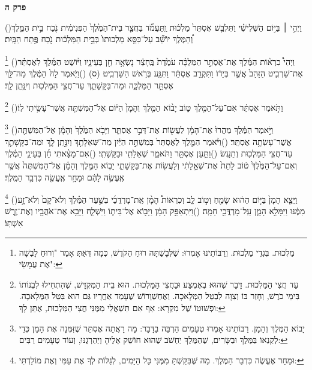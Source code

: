 \documentclass[12pt, openany]{book}
\newcommand{\sethebfont}{
\fontsize{10.5pt}{13.1pt} \selectfont
}
\newcommand{\twocol}[1]{
	{\sethebfont \begin{multicols}{2}
			#1
	\end{multicols}}	
}
\newcommand{\chapname}{}
\newcommand{\newchap}[1]{
	\addcontentsline{toc}{chapter}{#1}
	\renewcommand{\chapname}{#1}
		\begin{center}
			\textbf{%
\fontsize{16pt}{16pt}\selectfont
				#1}
		\end{center}
}
\newcommand{\footnotecomment}[1]{
	\renewcommand\thefootnote{}
	\footnote{#1}}
\newcommand{\commenta}[1]{\footnotecomment{#1}\hspace{0em}}
\newcommand{\vsnum}[1]{(\hebrewnumeral{#1})\space}
\begin{document}
\newchap{פרק ה}
\twocol{\vsnum{1}וַיְהִ֣י ׀ בַּיּ֣וֹם הַשְּׁלִישִׁ֗י וַתִּלְבַּ֤שׁ אֶסְתֵּר֙ מַלְכ֔וּת וַֽתַּעֲמֹ֞ד בַּחֲצַ֤ר בֵּית־הַמֶּ֙לֶךְ֙ הַפְּנִימִ֔ית נֹ֖כַח בֵּ֣ית הַמֶּ֑לֶךְ וְ֠הַמֶּלֶךְ יוֹשֵׁ֞ב עַל־כִּסֵּ֤א מַלְכוּתוֹ֙ בְּבֵ֣ית הַמַּלְכ֔וּת נֹ֖כַח פֶּ֥תַח הַבָּֽיִת׃%
\commenta{מַלְכוּת. בִּגְדֵי מַלְכוּת. וְרַבּוֹתֵינוּ אָמְרוּ: שֶׁלְּבָשַׁתָּה רוּחַ הַקֹּדֶשׁ, כְּמָה דְּאַתְּ אָמַר "וְרוּחַ לָבְשָׁה אֶת עֲמָשַׂי": }%
\vsnum{2}וַיְהִי֩ כִרְא֨וֹת הַמֶּ֜לֶךְ אֶת־אֶסְתֵּ֣ר הַמַּלְכָּ֗ה עֹמֶ֙דֶת֙ בֶּֽחָצֵ֔ר נָשְׂאָ֥ה חֵ֖ן בְּעֵינָ֑יו וַיּ֨וֹשֶׁט הַמֶּ֜לֶךְ לְאֶסְתֵּ֗ר אֶת־שַׁרְבִ֤יט הַזָּהָב֙ אֲשֶׁ֣ר בְּיָד֔וֹ וַתִּקְרַ֣ב אֶסְתֵּ֔ר וַתִּגַּ֖ע בְּרֹ֥אשׁ הַשַּׁרְבִֽיט׃ (ס)
\vsnum{3}וַיֹּ֤אמֶר לָהּ֙ הַמֶּ֔לֶךְ מַה־לָּ֖ךְ אֶסְתֵּ֣ר הַמַּלְכָּ֑ה וּמַה־בַּקָּשָׁתֵ֛ךְ עַד־חֲצִ֥י הַמַּלְכ֖וּת וְיִנָּ֥תֵֽן לָֽךְ׃%
\commenta{עַד חֲצִי הַמַּלְכוּת. דָּבָר שֶׁהוּא בְאֶמְצַע וּבַחֲצִי הַמַּלְכוּת. הוּא בֵית הַמִּקְדָּשׁ, שֶׁהִתְחִילוּ לִבְנוֹתוֹ בִּימֵי כֹרֶשׁ, וְחָזַר בּוֹ וְצִוָּה לְבַטֵּל הַמְּלָאכָה. וַאֲחַשְׁוֵרוֹשׁ שֶׁעָמַד אַחֲרָיו גַּם הוּא בִּטֵּל הַמְּלָאכָה. וּפְשׁוּטוֹ שֶׁל מִקְרָא: אַף אִם תִּשְׁאֲלִי מִמֶּנִּי חֲצִי הַמַּלְכוּת, אֶתֵּן לָךְ: }%
\vsnum{4}וַתֹּ֣אמֶר אֶסְתֵּ֔ר אִם־עַל־הַמֶּ֖לֶךְ ט֑וֹב יָב֨וֹא הַמֶּ֤לֶךְ וְהָמָן֙ הַיּ֔וֹם אֶל־הַמִּשְׁתֶּ֖ה אֲשֶׁר־עָשִׂ֥יתִי לֽוֹ׃%
\commenta{יָבוֹא הַמֶּלֶךְ וְהָמָן. רַבּוֹתֵינוּ אָמְרוּ טְעָמִים הַרְבֵּה בַדָּבָר: מָה רָאֲתָה אֶסְתֵּר שֶׁזִּמְּנָה אֶת הָמָן כְּדֵי לְקַנְאוֹ בַּמֶּלֶךְ וּבַשָּׂרִים, שֶׁהַמֶּלֶךְ יַחְשֹׁב שֶׁהוּא חוֹשֵׁק אֵלֶיהָ וְיַהַרְגֶנּוּ, וְעוֹד טְעָמִים רַבִּים: }%
\vsnum{5}וַיֹּ֣אמֶר הַמֶּ֔לֶךְ מַהֲרוּ֙ אֶת־הָמָ֔ן לַעֲשׂ֖וֹת אֶת־דְּבַ֣ר אֶסְתֵּ֑ר וַיָּבֹ֤א הַמֶּ֙לֶךְ֙ וְהָמָ֔ן אֶל־הַמִּשְׁתֶּ֖ה אֲשֶׁר־עָשְׂתָ֥ה אֶסְתֵּֽר׃
\vsnum{6}וַיֹּ֨אמֶר הַמֶּ֤לֶךְ לְאֶסְתֵּר֙ בְּמִשְׁתֵּ֣ה הַיַּ֔יִן מַה־שְּׁאֵלָתֵ֖ךְ וְיִנָּ֣תֵֽן לָ֑ךְ וּמַה־בַּקָּשָׁתֵ֛ךְ עַד־חֲצִ֥י הַמַּלְכ֖וּת וְתֵעָֽשׂ׃
\vsnum{7}וַתַּ֥עַן אֶסְתֵּ֖ר וַתֹּאמַ֑ר שְׁאֵלָתִ֖י וּבַקָּשָׁתִֽי׃
\vsnum{8}אִם־מָצָ֨אתִי חֵ֜ן בְּעֵינֵ֣י הַמֶּ֗לֶךְ וְאִם־עַל־הַמֶּ֙לֶךְ֙ ט֔וֹב לָתֵת֙ אֶת־שְׁאֵ֣לָתִ֔י וְלַעֲשׂ֖וֹת אֶת־בַּקָּשָׁתִ֑י יָב֧וֹא הַמֶּ֣לֶךְ וְהָמָ֗ן אֶל־הַמִּשְׁתֶּה֙ אֲשֶׁ֣ר אֶֽעֱשֶׂ֣ה לָהֶ֔ם וּמָחָ֥ר אֶֽעֱשֶׂ֖ה כִּדְבַ֥ר הַמֶּֽלֶךְ׃%
\commenta{וּמָחָר אֶעֱשֶׂה כִּדְבַר הַמֶּלֶךְ. מַה שֶּׁבִּקַּשְׁתָּ מִמֶּנִּי כָּל הַיָּמִים, לְגַלּוֹת לְךָ אֶת עַמִּי וְאֶת מוֹלַדְתִּי: }%
\vsnum{9}וַיֵּצֵ֤א הָמָן֙ בַּיּ֣וֹם הַה֔וּא שָׂמֵ֖חַ וְט֣וֹב לֵ֑ב וְכִרְאוֹת֩ הָמָ֨ן אֶֽת־מָרְדֳּכַ֜י בְּשַׁ֣עַר הַמֶּ֗לֶךְ וְלֹא־קָם֙ וְלֹא־זָ֣ע מִמֶּ֔נּוּ וַיִּמָּלֵ֥א הָמָ֛ן עַֽל־מָרְדֳּכַ֖י חֵמָֽה׃
\vsnum{10}וַיִּתְאַפַּ֣ק הָמָ֔ן וַיָּב֖וֹא אֶל־בֵּית֑וֹ וַיִּשְׁלַ֛ח וַיָּבֵ֥א אֶת־אֹהֲבָ֖יו וְאֶת־זֶ֥רֶשׁ אִשְׁתּֽוֹ׃%
}
\end{document}
